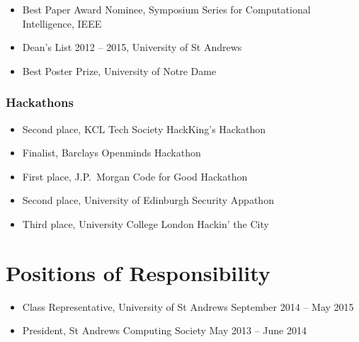 \documentclass[line,margin]{cv}
\begin{document}
\begin{resume}
\begin{itemize}
    \item Best Paper Award Nominee, Symposium Series for Computational
        Intelligence, IEEE
    \item Dean's List 2012 -- 2015, University of St Andrews
    \item Best Poster Prize, University of Notre Dame

\end{itemize}

\subsubsection{Hackathons}

\begin{itemize}

    \item Second place, KCL Tech Society HackKing's Hackathon
    \item Finalist, Barclays Openminds Hackathon
    \item First place, J.P.\ Morgan Code for Good Hackathon
    \item Second place, University of Edinburgh Security Appathon
    \item Third place, University College London Hackin' the City

\end{itemize}

%
%
%

\section{Positions of Responsibility}

\begin{itemize}

    \item Class Representative, University of St Andrews
        \hfill September 2014 -- May 2015
    \item President, St Andrews Computing Society
        \hfill May 2013 -- June 2014


\end{itemize}
\end{resume}
\end{document}
